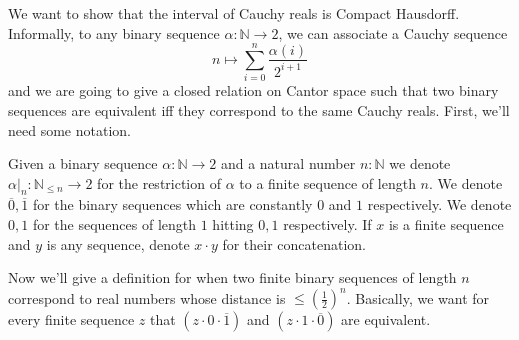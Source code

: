 We want to show that the interval of Cauchy reals is Compact Hausdorff. 
Informally, to any binary sequence $\alpha : \mathbb N \to 2$, 
we can associate a Cauchy sequence 
\begin{equation}\label{eqnBinaryEncode}
  n\mapsto \sum\limits_{i = 0 }^n \frac {\alpha(i)}{2^{i+1}}
\end{equation}
and we are going to give a closed relation on Cantor space such that 
two binary sequences are equivalent iff they correspond to the same Cauchy reals. 
%
First, we'll need some notation.
\begin{definition}
Given a binary sequence $\alpha:\mathbb N \to 2$ and a natural number $n : \mathbb N$  
we denote $\alpha|_n: \mathbb N_{\leq n} \to 2$ for the 
restriction of $\alpha$ to a finite sequence of length $n$. 
We denote $\overline 0, \overline 1$ for the binary sequences which are constantly $0$ and $1$ respectively. 
We denote $0,1$ for the sequences of length $1$ hitting $0,1$ respectively. 
If $x$ is a finite sequence and $y$ is any sequence, denote $x\cdot y$ for their concatenation. 
\end{definition} 
Now we'll give a definition for when two finite binary sequences of length $n$ correspond 
to real numbers whose distance is $\leq (\frac12)^n$.
Basically, we want for every finite sequence $z$ that 
$(z \cdot 0 \cdot \overline 1)$ and  $(z \cdot 1 \cdot \overline 0)$ are equivalent. 

